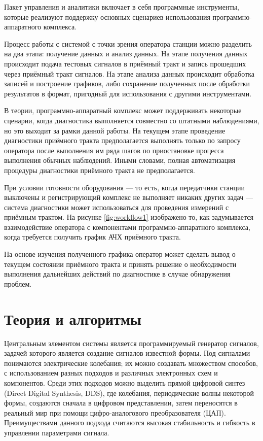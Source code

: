 \documentclass{report}
\begin{document}
Пакет управления и аналитики включает в себя программные инструменты, которые реализуют поддержку основных сценариев использования программно-аппаратного комплекса.

Процесс работы с системой с точки зрения оператора станции можно разделить на два этапа: получение данных и анализ данных. На этапе получения данных происходит подача тестовых сигналов в приёмный тракт и запись прошедших через приёмный тракт сигналов. На этапе анализа данных происходит обработка записей и построение графиков, либо сохранение полученных после обработки результатов в формат, пригодный для использования с другими инструментами.

В теории, программно-аппаратный комплекс может поддерживать некоторые сценарии, когда диагностика выполняется совместно со штатными наблюдениями, но это выходит за рамки данной работы. На текущем этапе проведение диагностики приёмного тракта предполагается выполнять только по запросу оператора после выполнения им ряда шагов по приостановке процесса выполнения обычных наблюдений. Иными словами, полная автоматизация процедуры диагностики приёмного тракта не предполагается.

При условии готовности оборудования --- то есть, когда передатчики станции выключены и регистрирующий комплекс не выполняет никаких других задач --- система диагностики может использоваться для проведения измерений с приёмным трактом. На рисунке \ref{fig:workflow1} изображено то, как задумывается взаимодействие оператора с компонентами программно-аппаратного комплекса, когда требуется получить график АЧХ приёмного тракта.


На основе изучения полученного графика оператор может сделать вывод о текущем состоянии приёмного тракта и принять решение о необходимости выполнения дальнейших действий по диагностике в случае обнаружения проблем.

\section{Теория и алгоритмы}

Центральным элементом системы является программируемый генератор сигналов, задачей которого является создание сигналов известной формы. Под сигналами понимаются электрические колебания; их можно создавать множеством способов, с использованием разных подходов и различных электронных схем и компонентов. Среди этих подходов можно выделить прямой цифровой синтез (Direct Digital Synthesis, DDS), где колебания, периодические волны некоторой формы, создаются сначала в цифровом представлении, затем переносятся в реальный мир при помощи цифро-аналогового преобразователя (ЦАП). Преимуществами данного подхода считаются высокая стабильность и гибкость в управлении параметрами сигнала.
\end{document}
